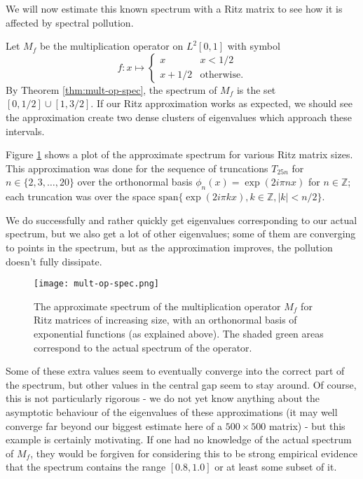 \documentclass[../main.tex]{subfiles}
\begin{document}
We will now estimate this known spectrum with a Ritz matrix to see how
it is affected by spectral pollution.

\begin{example}
  Let $M_f$ be the multiplication operator on $L^2[0, 1]$ with symbol
$$
f: x \mapsto \begin{cases}
x & x < 1/2 \\
x + 1/2 & \text{otherwise.}
\end{cases}
$$
By Theorem \ref{thm:mult-op-spec}, the spectrum of $M_f$ is the set $[0, 1/2]
\cup [1, 3/2]$. If our Ritz approximation works as expected, we should
see the approximation create two dense clusters of eigenvalues which
approach these intervals.
\end{example}

Figure \ref{fig:mult-op-spec} shows a plot of the approximate spectrum for
various Ritz matrix sizes. This approximation was done for the sequence of
truncations $T_{25n}$ for $n \in \{2, 3, \hdots, 20\}$ over the orthonormal
basis $\phi_n(x) = \exp(2 i \pi n x)$ for $n \in \mathbb{Z}$; each truncation
was over the space $\mathrm{span}\{\exp(2 i \pi k x), k \in \mathbb{Z}, |k| < n/2\}$.

We do successfully and rather quickly get eigenvalues corresponding to our
actual spectrum, but we also get a lot of other eigenvalues; some of them are
converging to points in the spectrum, but as the approximation improves, the
pollution doesn't fully dissipate.

\begin{figure}[h]
\centering
\texttt{[image: mult-op-spec.png]}
\caption{The approximate spectrum of the multiplication operator $M_f$ for Ritz
	matrices of increasing size, with an orthonormal basis of exponential
  functions (as explained above).
  The shaded green areas correspond to the
	actual spectrum of the operator.}
\label{fig:mult-op-spec}	
\end{figure}

Some of these extra values seem to eventually converge into the correct part of
the spectrum, but other values in the central gap seem to stay around.
Of course, this is not particularly rigorous - we do not yet know anything about
the asymptotic behaviour of the eigenvalues of these approximations (it may well
converge far beyond our biggest estimate here of a $500 \times 500$ matrix) -
but this example is certainly motivating. If one had no knowledge of the actual
spectrum of $M_f$, they would be forgiven for considering this to be strong
empirical evidence that the spectrum contains the range $[0.8, 1.0]$ or at least
some subset of it.
\end{document}
